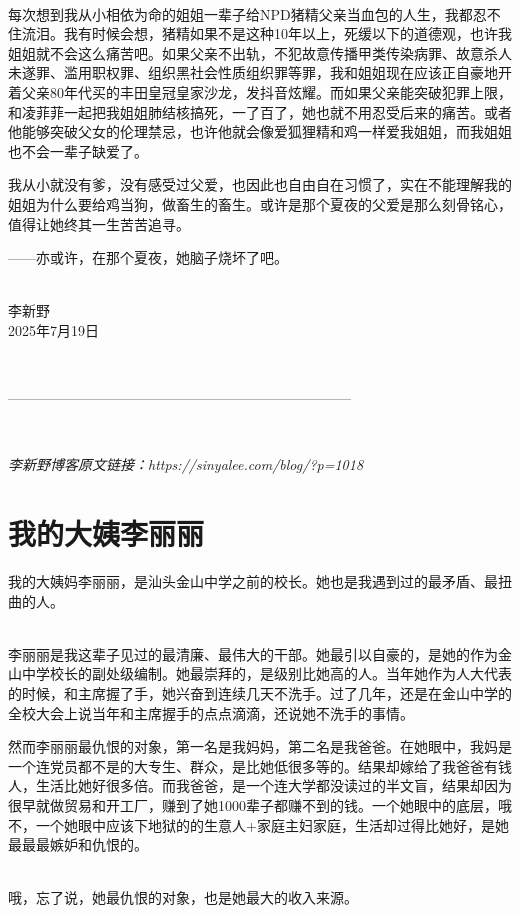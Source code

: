 \ 

每次想到我从小相依为命的姐姐一辈子给NPD猪精父亲当血包的人生，我都忍不住流泪。我有时候会想，猪精如果不是这种10年以上，死缓以下的道德观，也许我姐姐就不会这么痛苦吧。如果父亲不出轨，不犯故意传播甲类传染病罪、故意杀人未遂罪、滥用职权罪、组织黑社会性质组织罪等罪，我和姐姐现在应该正自豪地开着父亲80年代买的丰田皇冠皇家沙龙，发抖音炫耀。而如果父亲能突破犯罪上限，和凌菲菲一起把我姐姐肺结核搞死，一了百了，她也就不用忍受后来的痛苦。或者他能够突破父女的伦理禁忌，也许他就会像爱狐狸精和鸡一样爱我姐姐，而我姐姐也不会一辈子缺爱了。

我从小就没有爹，没有感受过父爱，也因此也自由自在习惯了，实在不能理解我的姐姐为什么要给鸡当狗，做畜生的畜生。或许是那个夏夜的父爱是那么刻骨铭心，值得让她终其一生苦苦追寻。

——亦或许，在那个夏夜，她脑子烧坏了吧。

\ \\
李新野\\
2025年7月19日

\ 

--------------------------------------------------------------------------

\

\textit{李新野博客原文链接：https://sinyalee.com/blog/?p=1018}

\newpage

\section{我的大姨李丽丽}
\label{aunt}
我的大姨妈李丽丽，是汕头金山中学之前的校长。她也是我遇到过的最矛盾、最扭曲的人。

\ \\
李丽丽是我这辈子见过的最清廉、最伟大的干部。她最引以自豪的，是她的作为金山中学校长的副处级编制。她最崇拜的，是级别比她高的人。当年她作为人大代表的时候，和主席握了手，她兴奋到连续几天不洗手。过了几年，还是在金山中学的全校大会上说当年和主席握手的点点滴滴，还说她不洗手的事情。

然而李丽丽最仇恨的对象，第一名是我妈妈，第二名是我爸爸。在她眼中，我妈是一个连党员都不是的大专生、群众，是比她低很多等的。结果却嫁给了我爸爸有钱人，生活比她好很多倍。而我爸爸，是一个连大学都没读过的半文盲，结果却因为很早就做贸易和开工厂，赚到了她1000辈子都赚不到的钱。一个她眼中的底层，哦不，一个她眼中应该下地狱的的生意人+家庭主妇家庭，生活却过得比她好，是她最最最嫉妒和仇恨的。

\ \\
哦，忘了说，她最仇恨的对象，也是她最大的收入来源。


